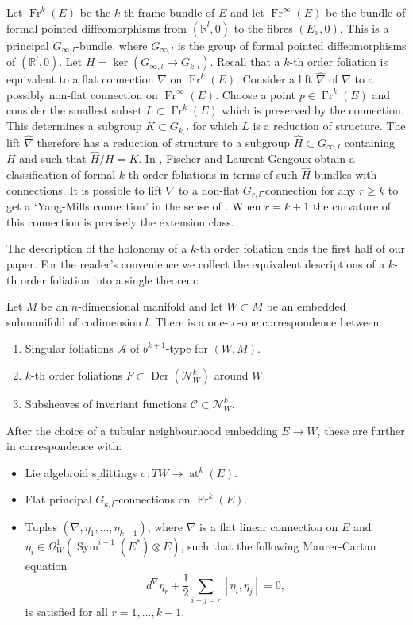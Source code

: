 \documentclass[10pt]{amsart}
\newcommand{\A}{{\mathcal{A}}}
\newcommand{\Ncal}{{\mathcal{N}}}
\newcommand{\Fr}{{\operatorname{Fr}}}
\newcommand{\C}{\mathcal{C}}
\DeclareMathOperator{\Der}{Der}
\DeclareMathOperator{\Sym}{Sym}
\renewcommand{\hat}{\widehat}
\DeclareMathOperator{\at}{at}
\numberwithin{theoremalpha}{section}
\numberwithin{equation}{section}
\numberwithin{definition}{section}
\numberwithin{theorem}{section}
\numberwithin{proposition}{section}
\numberwithin{lemma}{section}
\numberwithin{example}{section}
\numberwithin{remark}{section}
\numberwithin{corollary}{section}
\numberwithin{question}{section}
\numberwithin{problem}{section}
\numberwithin{assumption}{section}
\theoremstyle{named}
\numberwithin{equation}{section}
\begin{document}
\begin{remark}
Let $\Fr^{k}(E)$ be the $k$-th frame bundle of $E$ and let $\Fr^{\infty}(E)$ be the bundle of formal pointed diffeomorphisms from $(\mathbb{R}^l, 0)$ to the fibres $(E_{x}, 0)$. This is a principal $G_{\infty,l}$-bundle, where $G_{\infty,l}$ is the group of formal pointed diffeomorphisms of $(\mathbb{R}^l, 0)$. Let $H = \ker(G_{\infty,l} \to G_{k,l})$. Recall that a $k$-th order foliation is equivalent to a flat connection $\nabla$ on $\Fr^{k}(E)$. Consider a lift $\hat{\nabla}$ of $\nabla$ to a possibly non-flat connection on $\Fr^{\infty}(E)$. Choose a point $p \in \Fr^{k}(E)$ and consider the smallest subset $L \subset \Fr^{k}(E)$ which is preserved by the connection. This determines a subgroup $K \subset G_{k,l}$ for which $L$ is a reduction of structure. The lift $\hat{\nabla}$ therefore has a reduction of structure to a subgroup $\hat{H} \subset G_{\infty,l}$ containing $H$ and such that $\hat{H}/H = K$. In \cite{fischer2024classification}, Fischer and Laurent-Gengoux obtain a classification of formal $k$-th order foliations in terms of such $\hat{H}$-bundles with connections. It is possible to lift $\nabla$ to a non-flat $G_{r,l}$-connection for any $r \geq k$ to get a `Yang-Mills connection' in the sense of \cite{fischer2024classification}. When $r = k+1$ the curvature of this connection is precisely the extension class. 
\end{remark}

The description of the holonomy of a $k$-th order foliation ends the first half of our paper. For the reader's convenience we  collect the equivalent descriptions of a $k$-th order foliation into a single theorem:
\begin{theorem}\label{th:equivalence}
Let $M$ be an $n$-dimensional manifold and let $W \subset M$ be an embedded submanifold of codimension $l$. There is a one-to-one correspondence between:
\begin{enumerate}
\item Singular foliations $\A$ of $b^{k+1}$-type for $(W,M)$.
\item $k$-th order foliations $F \subset \Der(\mathcal{N}^k_W)$ around $W$.
\item Subsheaves of invariant functions $\C \subset \Ncal^k_W$.
\end{enumerate}
After the choice of a tubular neighbourhood embedding $E \to W$, these are further in correspondence with:
\begin{itemize}
\item[(4)] Lie algebroid splittings $\sigma : TW \rightarrow \at^k(E)$.
\item[(5)] Flat principal $G_{k,l}$-connections on $\Fr^k(E)$.
\item[(6)] Tuples $(\nabla, \eta_{1}, ..., \eta_{k-1})$, where $\nabla$ is a flat linear connection on $E$ and $\eta_i \in \Omega^1_W(\Sym^{i+1}(E^*)\otimes E)$, such that the following Maurer-Cartan equation 
\begin{equation*}
d^{\nabla} \eta_{r} + \frac{1}{2} \sum_{i + j = r} [\eta_{i}, \eta_{j}] = 0,
\end{equation*}
is satisfied for all $ r = 1, ..., k-1$.
\end{itemize}
\end{theorem}
\end{document}
